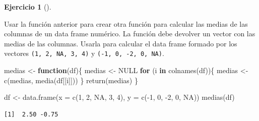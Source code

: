 \documentclass[
  a4paper,
]{scrreport}
\newenvironment{Shaded}{\begin{snugshade}}{\end{snugshade}}
\newcommand{\AttributeTok}[1]{\textcolor[rgb]{0.40,0.45,0.13}{#1}}
\newcommand{\ConstantTok}[1]{\textcolor[rgb]{0.56,0.35,0.01}{#1}}
\newcommand{\ControlFlowTok}[1]{\textcolor[rgb]{0.00,0.23,0.31}{\textbf{#1}}}
\newcommand{\DecValTok}[1]{\textcolor[rgb]{0.68,0.00,0.00}{#1}}
\newcommand{\FunctionTok}[1]{\textcolor[rgb]{0.28,0.35,0.67}{#1}}
\newcommand{\NormalTok}[1]{\textcolor[rgb]{0.00,0.23,0.31}{#1}}
\newcommand{\OtherTok}[1]{\textcolor[rgb]{0.00,0.23,0.31}{#1}}
\newcommand{\SpecialCharTok}[1]{\textcolor[rgb]{0.37,0.37,0.37}{#1}}
\theoremstyle{definition}
\newtheorem{exercise}{Ejercicio}[chapter]
\theoremstyle{definition}
\theoremstyle{remark}
\begin{document}
\begin{exercise}[]\protect\hypertarget{exr-funciones-2}{}\label{exr-funciones-2}

Usar la función anterior para crear otra función para calcular las
medias de las columnas de un data frame numérico. La función debe
devolver un vector con las medias de las columnas. Usarla para calcular
el data frame formado por los vectores \texttt{(1,\ 2,\ NA,\ 3,\ 4)} y
\texttt{(-1,\ 0,\ -2,\ 0,\ NA)}.

\begin{tcolorbox}[enhanced jigsaw, title=\textcolor{quarto-callout-note-color}{\faInfo}\hspace{0.5em}{Solución}, titlerule=0mm, toprule=.15mm, colbacktitle=quarto-callout-note-color!10!white, arc=.35mm, colframe=quarto-callout-note-color-frame, opacitybacktitle=0.6, coltitle=black, left=2mm, colback=white, opacityback=0, breakable, bottomrule=.15mm, toptitle=1mm, leftrule=.75mm, bottomtitle=1mm, rightrule=.15mm]

\begin{Shaded}
\begin{Highlighting}[]
\NormalTok{medias }\OtherTok{\textless{}{-}} \ControlFlowTok{function}\NormalTok{(df)\{}
\NormalTok{medias }\OtherTok{\textless{}{-}} \ConstantTok{NULL}
\ControlFlowTok{for}\NormalTok{ (i }\ControlFlowTok{in} \FunctionTok{colnames}\NormalTok{(df))\{}
\NormalTok{  medias }\OtherTok{\textless{}{-}} \FunctionTok{c}\NormalTok{(medias, }\FunctionTok{media}\NormalTok{(df[[i]]))}
\NormalTok{\}}
\FunctionTok{return}\NormalTok{(medias)}
\NormalTok{\}}

\NormalTok{df }\OtherTok{\textless{}{-}} \FunctionTok{data.frame}\NormalTok{(}\AttributeTok{x =} \FunctionTok{c}\NormalTok{(}\DecValTok{1}\NormalTok{, }\DecValTok{2}\NormalTok{, }\ConstantTok{NA}\NormalTok{, }\DecValTok{3}\NormalTok{, }\DecValTok{4}\NormalTok{), }\AttributeTok{y =} \FunctionTok{c}\NormalTok{(}\SpecialCharTok{{-}}\DecValTok{1}\NormalTok{, }\DecValTok{0}\NormalTok{, }\SpecialCharTok{{-}}\DecValTok{2}\NormalTok{, }\DecValTok{0}\NormalTok{, }\ConstantTok{NA}\NormalTok{))}
\FunctionTok{medias}\NormalTok{(df)}
\end{Highlighting}
\end{Shaded}

\begin{verbatim}
[1]  2.50 -0.75
\end{verbatim}

\end{tcolorbox}

\end{exercise}
\end{document}
